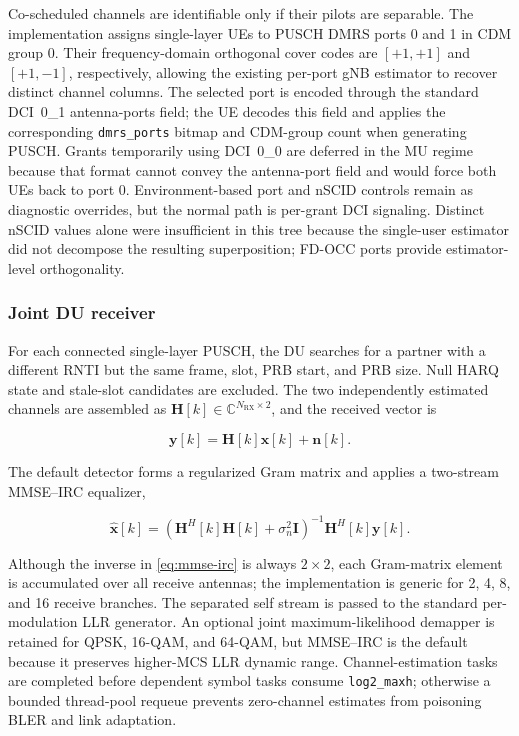 \documentclass[11pt,a4paper]{article}
\begin{document}
Co-scheduled channels are identifiable only if their pilots are separable.  The implementation
assigns single-layer UEs to PUSCH DMRS ports 0 and 1 in CDM group 0.  Their frequency-domain
orthogonal cover codes are $[+1,+1]$ and $[+1,-1]$, respectively, allowing the existing per-port
gNB estimator to recover distinct channel columns.  The selected port is encoded through the
standard DCI~0\_1 antenna-ports field; the UE decodes this field and applies the corresponding
\texttt{dmrs\_ports} bitmap and CDM-group count when generating PUSCH.  Grants temporarily using
DCI~0\_0 are deferred in the MU regime because that format cannot convey the antenna-port field
and would force both UEs back to port 0.  Environment-based port and nSCID controls remain as
diagnostic overrides, but the normal path is per-grant DCI signaling.  Distinct nSCID values
alone were insufficient in this tree because the single-user estimator did not decompose the
resulting superposition; FD-OCC ports provide estimator-level orthogonality.

\subsubsection{Joint DU receiver}

For each connected single-layer PUSCH, the DU searches for a partner with a different RNTI but
the same frame, slot, PRB start, and PRB size.  Null HARQ state and stale-slot candidates are
excluded.  The two independently estimated channels are assembled as
$\mathbf{H}[k]\in\mathbb{C}^{N_{\mathrm{RX}}\times 2}$, and the received vector is

\begin{equation}
  \mathbf{y}[k]=\mathbf{H}[k]\mathbf{x}[k]+\mathbf{n}[k].
  \label{eq:mu-model}
\end{equation}

The default detector forms a regularized Gram matrix and applies a two-stream MMSE--IRC
equalizer,

\begin{equation}
  \widehat{\mathbf{x}}[k] =
  \left(\mathbf{H}^{H}[k]\mathbf{H}[k]+\sigma_n^2\mathbf{I}\right)^{-1}
  \mathbf{H}^{H}[k]\mathbf{y}[k].
  \label{eq:mmse-irc}
\end{equation}

Although the inverse in \eqref{eq:mmse-irc} is always $2\times2$, each Gram-matrix element is
accumulated over all receive antennas; the implementation is generic for 2, 4, 8, and 16 receive
branches.  The separated self stream is passed to the standard per-modulation LLR generator.
An optional joint maximum-likelihood demapper is retained for QPSK, 16-QAM, and 64-QAM, but
MMSE--IRC is the default because it preserves higher-MCS LLR dynamic range.  Channel-estimation
tasks are completed before dependent symbol tasks consume \texttt{log2\_maxh}; otherwise a
bounded thread-pool requeue prevents zero-channel estimates from poisoning BLER and link
adaptation.
\end{document}
